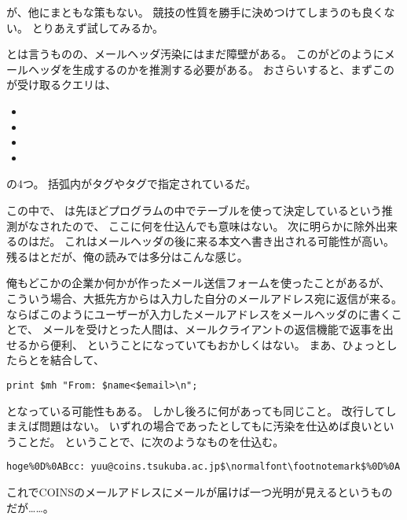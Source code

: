 が、他にまともな策もない。
競技の性質を勝手に決めつけてしまうのも良くない。
とりあえず試してみるか。

とは言うものの、メールヘッダ汚染にはまだ障壁がある。
このがどのようにメールヘッダを生成するのかを推測する必要がある。
おさらいすると、まずこのが受け取るクエリは、

\begin{itemize}
	\item {}
	\item {}
	\item {}
	\item {}
\end{itemize}

の4つ。
括弧内がタグやタグで指定されているだ。

この中で、
は先ほどプログラムの中でテーブルを使って決定しているという推測がなされたので、
ここに何を仕込んでも意味はない。
次に明らかに除外出来るのはだ。
これはメールヘッダの後に来る本文へ書き出される可能性が高い。
残るはとだが、俺の読みでは多分はこんな感じ。



俺もどこかの企業か何かが作ったメール送信フォームを使ったことがあるが、
こういう場合、大抵先方からは入力した自分のメールアドレス宛に返信が来る。
ならばこのようにユーザーが入力したメールアドレスをメールヘッダのに書くことで、
メールを受けとった人間は、メールクライアントの返信機能で返事を出せるから便利、
ということになっていてもおかしくはない。
まあ、ひょっとしたらとを結合して、

\begin{lstlisting}[style=perl, firstnumber=11]
print $mh "From: $name<$email>\n";
\end{lstlisting}

となっている可能性もある。
しかし後ろに何があっても同じこと。
改行してしまえば問題はない。
いずれの場合であったとしてもに汚染を仕込めば良いということだ。
ということで、に次のようなものを仕込む。

\begin{lstlisting}[mathescape]
hoge%0D%0ABcc: yuu@coins.tsukuba.ac.jp$\normalfont\footnotemark$%0D%0A
\end{lstlisting}

これでCOINSのメールアドレスにメールが届けば一つ光明が見えるというものだが……。




